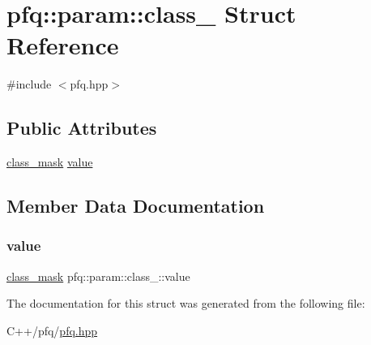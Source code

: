 \hypertarget{structpfq_1_1param_1_1class__}{}\section{pfq\+:\+:param\+:\+:class\+\_\+ Struct Reference}
\label{structpfq_1_1param_1_1class__}


{\ttfamily \#include $<$pfq.\+hpp$>$}

\subsection*{Public Attributes}
\begin{DoxyCompactItemize}
\item 
\hyperlink{namespacepfq_a96af1f5ed530eff563eb917516758fbb}{class\+\_\+mask} \hyperlink{structpfq_1_1param_1_1class___a014cc8b1b64e04bbcd9d8f2ed793efbb}{value}
\end{DoxyCompactItemize}


\subsection{Member Data Documentation}
\mbox{\label{structpfq_1_1param_1_1class___a014cc8b1b64e04bbcd9d8f2ed793efbb}} 
\subsubsection{\texorpdfstring{value}{value}}
{\footnotesize\ttfamily \hyperlink{namespacepfq_a96af1f5ed530eff563eb917516758fbb}{class\+\_\+mask} pfq\+::param\+::class\+\_\+\+::value}



The documentation for this struct was generated from the following file\+:\begin{DoxyCompactItemize}
\item 
C++/pfq/\hyperlink{pfq_8hpp}{pfq.\+hpp}\end{DoxyCompactItemize}
